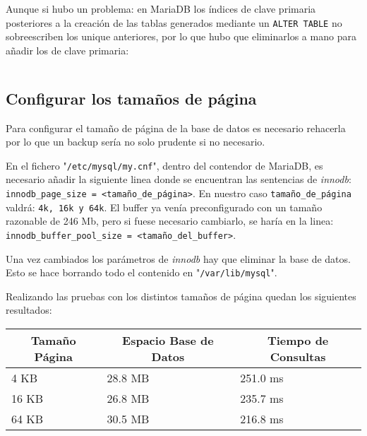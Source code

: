 \documentclass[a4paper, 11pt, oneside]{article} %
\newcommand{\scriptdir}{../scripts/} %
\begin{document}
Aunque si hubo un problema: en MariaDB los índices de clave primaria posteriores a la creación de las tablas generados mediante un \texttt{ALTER TABLE} no sobreescriben los unique anteriores, por lo que hubo que eliminarlos a mano para añadir los de clave primaria:

\inputminted{mysql}{\scriptdir remplazar_indices_pk_xammp.sql}




\subsection{Configurar los tamaños de página}

Para configurar el tamaño de página de la base de datos es necesario rehacerla por lo que un backup sería no solo prudente si no necesario.

En el fichero "\texttt{/etc/mysql/my.cnf}", dentro del contendor de MariaDB, es necesario añadir la siguiente linea donde se encuentran las sentencias de \emph{innodb}: \texttt{innodb_page_size = <tamaño_de_página>}. En nuestro caso \texttt{tamaño_de_página} valdrá: \texttt{4k, 16k y 64k}. El buffer ya venía preconfigurado con un tamaño razonable de 246 Mb, pero si fuese necesario cambiarlo, se haría en la linea: \texttt{innodb_buffer_pool_size = <tamaño_del_buffer>}.

Una vez cambiados los parámetros de \emph{innodb} hay que eliminar la base de datos. Esto se hace borrando todo el contenido en "\texttt{/var/lib/mysql}".

Realizando las pruebas con los distintos tamaños de página quedan los siguientes resultados:

\begin{table}[H]
\centering
\begin{tabular}{|l|l|l|}
\hline
\multicolumn{1}{|c|}{Tamaño Página} & \multicolumn{1}{c|}{Espacio Base de Datos} & \multicolumn{1}{c|}{Tiempo de Consultas} \\ \hline
4 KB                                & 28.8 MB                                    & 251.0 ms                                 \\ \hline
16 KB                               & 26.8 MB                                    & 235.7 ms                                 \\ \hline
64 KB                               & 30.5 MB                                    & 216.8 ms                                 \\ \hline
\end{tabular}
\end{table}
\end{document}
